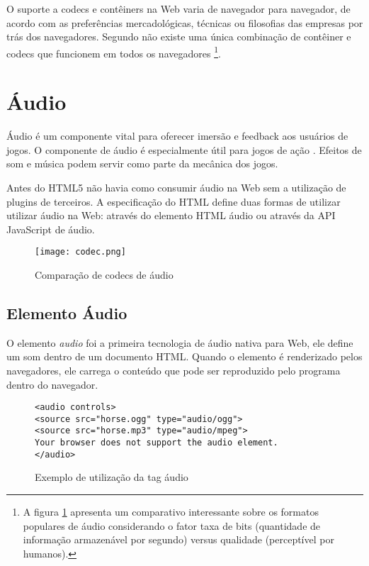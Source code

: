 O suporte a codecs e contêiners na Web varia de navegador para
navegador, de acordo com as preferências mercadológicas, técnicas
ou filosofias das empresas por trás dos navegadores. Segundo
\citet{diveIntohtml} não existe uma única combinação de contêiner
e codecs que funcionem em todos os navegadores \footnote{A figura
\ref{fig:audioCodecs} apresenta um comparativo interessante sobre
os formatos populares de áudio considerando o fator taxa de bits
(quantidade de informação armazenável por segundo) versus qualidade
(perceptível por humanos).}.

\section{Áudio}

Áudio é um componente vital para oferecer imersão e feedback aos
usuários de jogos. O componente de áudio é especialmente útil para
jogos de ação \autocite{browserGamesTechnologyAndFuture}. Efeitos
de som e música podem servir como parte da mecânica dos jogos.

Antes do HTML5 não havia como consumir áudio na Web sem a utilização de
plugins de terceiros. A especificação do HTML define duas formas de
utilizar utilizar áudio na Web: através do elemento HTML áudio ou
através da API JavaScript de áudio.

\begin{figure}[H]
    \centering
    \texttt{[image: codec.png]}
	\caption{Comparação de codecs de áudio}
    \label{fig:audioCodecs}
\end{figure}

\subsection{Elemento Áudio}

O elemento \textit{audio} foi a primeira tecnologia de áudio nativa
para Web, ele define um som dentro de um documento HTML. Quando o
elemento é renderizado pelos navegadores, ele carrega o conteúdo que
pode ser reproduzido pelo programa dentro do navegador.

\begin{figure}[H]
\centering
\begin{verbatim}
<audio controls>
<source src="horse.ogg" type="audio/ogg">
<source src="horse.mp3" type="audio/mpeg">
Your browser does not support the audio element.
</audio>
\end{verbatim}
\caption{Exemplo de utilização da tag áudio}
\label{fig:htmlAudio}
\end{figure}


